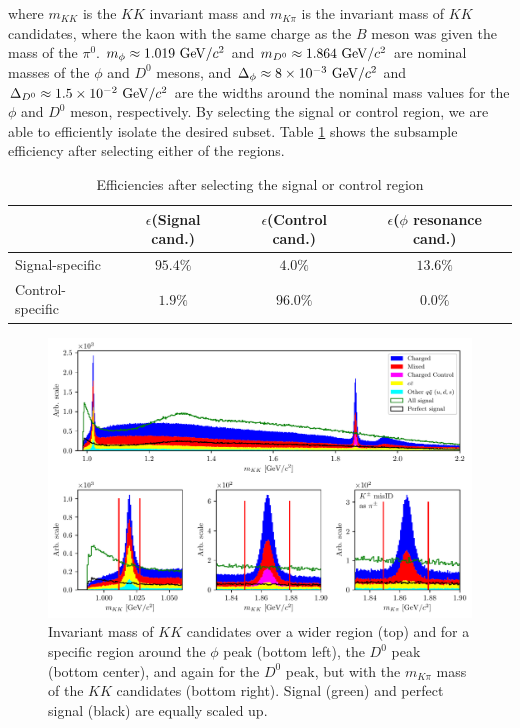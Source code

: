 where $m_{KK}$ is the $KK$ invariant mass and $m_{K\pi}$ is the invariant mass of $KK$ candidates, where the kaon with the same charge as the $B$ meson was given the mass of the $\pi^0$. $m_\phi \approx 1.019\mathrm{~GeV}/c^2$ and $m_{D^0} \approx 1.864\mathrm{~GeV}/c^2$ are nominal masses of the $\phi$ and $D^0$ mesons, and $\Delta_\phi \approx 8\times 10^{-3}\mathrm{~GeV}/c^2$ and $\Delta_{D^0} \approx 1.5\times 10^{-2}\mathrm{~GeV}/c^2$ are the widths around the nominal mass values for the $\phi$ and $D^0$ meson, respectively. By selecting the signal or control region, we are able to efficiently isolate the desired subset. Table \ref{tab:cut_eff} shows the subsample efficiency after selecting either of the regions.

\begin{table}[H]
	\centering
	\begin{tabular}{l|c|c|c}
		& $\epsilon$(Signal cand.)& $\epsilon$(Control cand.) & $\epsilon$($\phi$ resonance cand.)\\
		\toprule
		Signal-specific & $95.4\%$ & $4.0\%$ & $13.6\%$ \\
		Control-specific & $1.9\%$ & $96.0\%$ & $0.0\%$ \\
		\bottomrule
	\end{tabular}
	\caption{Efficiencies after selecting the signal or control region}
	\label{tab:cut_eff}
\end{table}


\begin{figure}[H]
	\centering
	\captionsetup{width=0.8\linewidth}
	\includegraphics[width=\linewidth]{fig/res_bkg}
	\caption{Invariant mass of $KK$ candidates over a wider region (top) and for a specific region around the $\phi$ peak (bottom left), the $D^0$ peak (bottom center), and again for the $D^0$ peak, but with the $m_{K\pi}$ mass of the $KK$ candidates (bottom right). Signal (green) and perfect signal (black) are equally scaled up.}
	\label{fig:res_bkg}
\end{figure}


